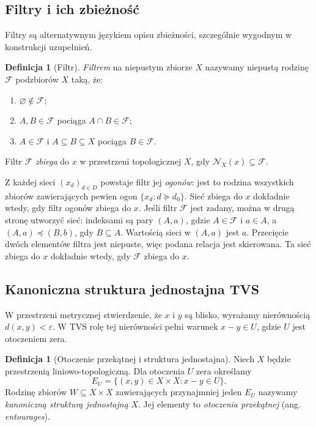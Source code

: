 \documentclass[11pt,a4paper]{article}
\numberwithin{equation}{section}
\theoremstyle{plain}
\theoremstyle{definition}
\newtheorem{definicja}[twierdzenie]{Definicja}
\theoremstyle{remark}
\begin{document}
\subsection{Filtry i ich zbieżność}

Filtry są alternatywnym językiem opisu zbieżności, szczególnie
wygodnym w konstrukcji uzupełnień.

\begin{definicja}[Filtr]\label{def:filter}
\emph{Filtrem} na niepustym zbiorze $X$ nazywamy niepustą rodzinę
$\mathcal F$ podzbiorów $X$ taką, że:
\begin{enumerate}[label=\textup{(\roman*)}]
\item $\varnothing\notin\mathcal F$;
\item $A,B\in\mathcal F$ pociąga $A\cap B\in\mathcal F$;
\item $A\in\mathcal F$ i $A\subseteq B\subseteq X$ pociąga
      $B\in\mathcal F$.
\end{enumerate}
Filtr $\mathcal F$ \emph{zbiega} do $x$ w przestrzeni topologicznej $X$,
gdy $\mathcal N_X(x)\subseteq\mathcal F$.
\end{definicja}

Z każdej sieci $(x_d)_{d\in D}$ powstaje filtr jej \emph{ogonów}:
jest to rodzina wszystkich zbiorów zawierających pewien ogon
$\{x_d:d\succeq d_0\}$. Sieć zbiega do $x$ dokładnie wtedy,
gdy filtr ogonów zbiega do $x$. Jeśli filtr $\mathcal F$ jest zadany,
można w drugą stronę utworzyć sieć: indeksami są pary $(A,a)$,
gdzie $A\in\mathcal F$ i $a\in A$, a
$(A,a)\preceq(B,b)$, gdy $B\subseteq A$.
Wartością sieci w $(A,a)$ jest $a$. Przecięcie dwóch elementów filtra
jest niepuste, więc podana relacja jest skierowana. Ta sieć zbiega
do $x$ dokładnie wtedy, gdy $\mathcal F$ zbiega do $x$.

\subsection{Kanoniczna struktura jednostajna TVS}

W przestrzeni metrycznej stwierdzenie, że $x$ i $y$ są blisko,
wyrażamy nierównością $d(x,y)<\varepsilon$. W TVS rolę tej nierówności
pełni warunek $x-y\in U$, gdzie $U$ jest otoczeniem zera.

\begin{definicja}[Otoczenie przekątnej i struktura jednostajna]
Niech $X$ będzie przestrzenią liniowo-topologiczną. Dla otoczenia
$U$ zera określamy
\[
 E_U=\{(x,y)\in X\times X:x-y\in U\}.
\]
Rodzinę zbiorów $W\subseteq X\times X$ zawierających przynajmniej
jeden $E_U$ nazywamy \emph{kanoniczną strukturą jednostajną} $X$.
Jej elementy to \emph{otoczenia przekątnej} (ang. \emph{entourages}).
\end{definicja}
\end{document}
